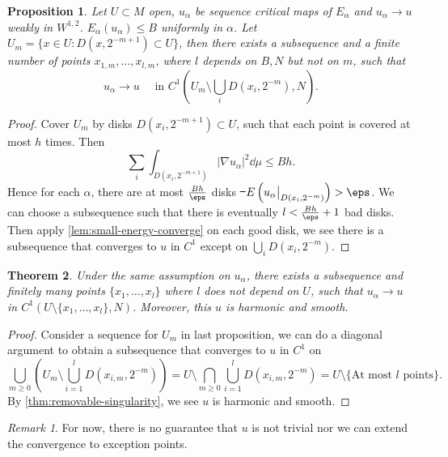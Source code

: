 \documentclass[UTF8,12pt]{article}
\theoremstyle{plain}\newtheorem{theorem}{Theorem}
\theoremstyle{definition}\newtheorem{definition}[theorem]{Definition}
\theoremstyle{definition}\newtheorem{example}[theorem]{Example}
\theoremstyle{plain}\newtheorem{axiom}[theorem]{Axiom}
\theoremstyle{plain}\newtheorem{assertion}[theorem]{Assertion}
\theoremstyle{plain}\newtheorem{corollary}[theorem]{Corollary}
\theoremstyle{plain}\newtheorem{lemma}[theorem]{Lemma}
\theoremstyle{plain}\newtheorem{proposition}[theorem]{Proposition}
\theoremstyle{plain}\newtheorem{prop}[theorem]{Proposition}
\theoremstyle{plain}\newtheorem{conjecture}[theorem]{Conjecture}
\theoremstyle{plain}\newtheorem{conj}[theorem]{Conjecture}
\theoremstyle{plain}\newtheorem{problem}[theorem]{Problem}
\theoremstyle{remark}\newtheorem{notation}[theorem]{Notation}
\theoremstyle{definition}\newtheorem*{question}{Question}
\theoremstyle{definition}\newtheorem*{answer}{Answer}
\theoremstyle{definition}\newtheorem*{goal}{Goal}
\theoremstyle{plain}\newtheorem*{application}{Application}
\theoremstyle{plain}\newtheorem*{exercise}{Exercise}
\theoremstyle{remark}\newtheorem*{remark}{Remark}
\theoremstyle{remark}\newtheorem*{note}{\small{Note}}
\numberwithin{equation}{section}
\numberwithin{theorem}{section}
\numberwithin{figure}{section}
\begin{document}
\begin{prop}
    Let \(U\subset M\) open, \(u_\alpha\) be sequence critical maps of \(E_\alpha\)
    and \(u_\alpha\to u\) weakly in \(W^{1,2}\). \(E_\alpha(u_\alpha)\le B\) uniformly
    in \(\alpha\). Let \(U_m=\{x\in U:D(x,2^{-m+1})\subset U\}\), then there exists
    a subsequence and a finite number of points \(x_{1,m},\ldots,x_{l,m}\), where
    \(l\) depends on \(B,N\) but not on \(m\), such that \[
        u_\alpha\longrightarrow u\quad\text{ in }
        C^1(U_m\setminus\bigcup_{i}D(x_i,2^{-m}),N)
    .\] 
\end{prop}
\begin{proof}
    Cover \(U_m\) by disks \(D(x_i,2^{-m+1})\subset U\), such that each point is
    covered at most \(h\) times. Then \[
        \sum_i \int_{D(x_i,2^{-m+1})}|\nabla u_\alpha|^2\dd{\mu}\le Bh
    .\] Hence for each \(\alpha\), there are at most \(\frac{Bh}{\eps}\) disks \st\ 
    \(E\left(u_\alpha\big|_{D(x_i,2^{-m})}\right)>\eps\).
    We can choose a subsequence such that there is eventually \(l<\frac{Bh}{\eps}+1\)
    bad disks. Then apply \cref{lem:small-energy-converge} on each good disk, we see
    there is a subsequence that converges to \(u\) in \(C^1\) except on
    \(\bigcup_{i}D(x_i,2^{-m})\).
\end{proof}

\begin{theorem}\label{thm:alpha-convergence}
    Under the same assumption on \(u_\alpha\), there exists a subsequence and finitely
    many points \(\{x_1,\ldots,x_l\}\) where \(l\) does not depend on \(U\), such that
    \(u_\alpha\to u\) in \(C^1(U\setminus\{x_1,\ldots,x_l\},N)\).
    Moreover, this \(u\) is harmonic and smooth.
\end{theorem}
\begin{proof}
    Consider a sequence for \(U_m\) in last proposition, we can do a diagonal argument
    to obtain a subsequence that converges to \(u\) in \(C^1\) on \[
        \bigcup_{m\ge 0}\left(U_m\setminus \bigcup_{i=1}^l D(x_{i,m},2^{-m})\right)
        =U\setminus\bigcap_{m\ge 0}\bigcup_{i=1}^l D(x_{i,m},2^{-m})
        =U\setminus\{\text{At most }l\text{ points}\}
    .\] By \cref{thm:removable-singularity}, we see \(u\) is harmonic and smooth.
\end{proof}
\begin{remark}
    For now, there is no guarantee that \(u\) is not trivial nor we can extend the
    convergence to exception points.
\end{remark}
\end{document}
